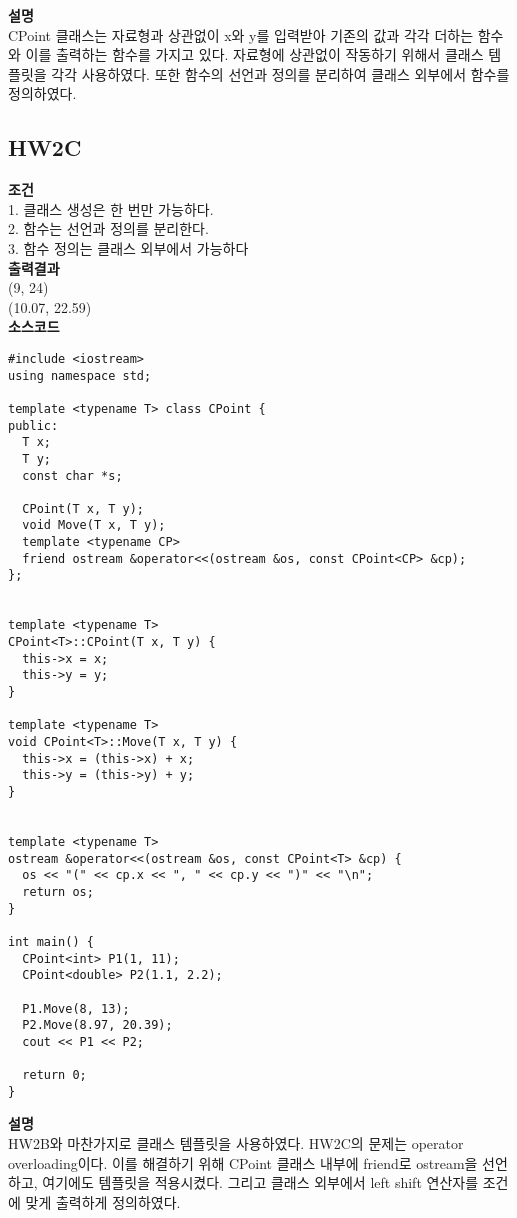 \documentclass{article}
\begin{document}
\noindent \textbf{설명} \\
CPoint 클래스는 자료형과 상관없이 x와 y를 입력받아 기존의 값과 각각 더하는 함수와 이를 출력하는 함수를 가지고 있다. 자료형에 상관없이 작동하기 위해서 클래스 템플릿을 각각 사용하였다. 또한 함수의 선언과 정의를 분리하여 클래스 외부에서 함수를 정의하였다.




\subsection{HW2C}
\noindent \textbf{조건} \\ 1. 클래스 생성은 한 번만 가능하다. \\ 2. 함수는 선언과 정의를 분리한다. \\ 3. 함수 정의는 클래스 외부에서 가능하다 \\

\noindent \textbf{출력결과} \\ (9, 24) \\ (10.07, 22.59) \\ 

\noindent \textbf{소스코드}
\begin{verbatim}
#include <iostream>
using namespace std;

template <typename T> class CPoint {
public:
  T x;
  T y;
  const char *s;

  CPoint(T x, T y);
  void Move(T x, T y);
  template <typename CP> 
  friend ostream &operator<<(ostream &os, const CPoint<CP> &cp);
};


template <typename T>
CPoint<T>::CPoint(T x, T y) {
  this->x = x;
  this->y = y;
}

template <typename T>
void CPoint<T>::Move(T x, T y) {
  this->x = (this->x) + x;
  this->y = (this->y) + y;
}


template <typename T>
ostream &operator<<(ostream &os, const CPoint<T> &cp) {
  os << "(" << cp.x << ", " << cp.y << ")" << "\n";
  return os;
}

int main() {
  CPoint<int> P1(1, 11);
  CPoint<double> P2(1.1, 2.2);

  P1.Move(8, 13);
  P2.Move(8.97, 20.39);
  cout << P1 << P2;

  return 0;
}
\end{verbatim}

\noindent \textbf{설명} \\
HW2B와 마찬가지로 클래스 템플릿을 사용하였다. HW2C의 문제는 operator overloading이다. 이를 해결하기 위해 CPoint 클래스 내부에 friend로 ostream을 선언하고, 여기에도 템플릿을 적용시켰다. 그리고 클래스 외부에서 left shift 연산자를 조건에 맞게 출력하게 정의하였다.
\end{document}
